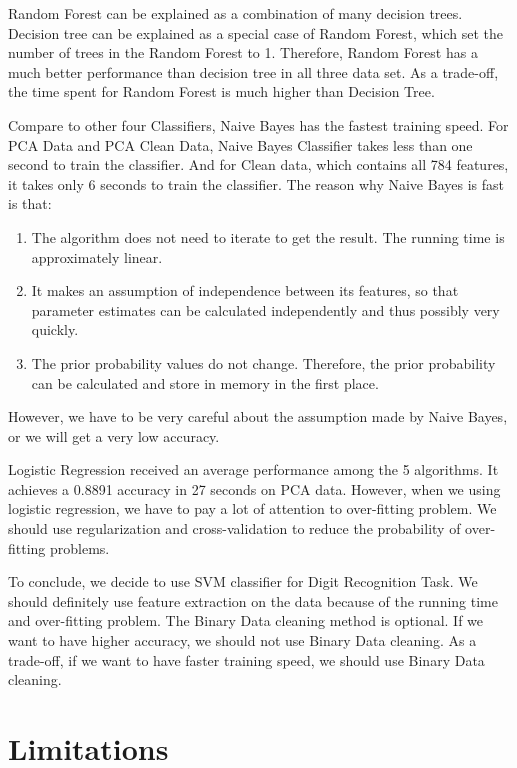\documentclass[sigconf]{acmart}
\begin{document}
Random Forest can be explained as a combination of many decision trees. Decision tree can be explained as a special case of Random Forest, which set the number of trees in the Random Forest to 1. Therefore, Random Forest has a much better performance than decision tree in all three data set. As a trade-off, the time spent for Random Forest is much higher than Decision Tree.

Compare to other four Classifiers, Naive Bayes has the fastest training speed. For PCA Data and PCA Clean Data, Naive Bayes Classifier takes less than one second to train the classifier. And for Clean data, which contains all 784 features, it takes only 6 seconds to train the classifier. The reason why Naive Bayes is fast is that:

\begin{enumerate}
    \item The algorithm does not need to iterate to get the result. The running time is approximately linear.
    \item It makes an assumption of independence between its features, so that parameter estimates can be calculated independently and thus possibly very quickly.
    \item The prior probability values do not change. Therefore, the prior probability can be calculated and store in memory in the first place. 
\end{enumerate}

However, we have to be very careful about the assumption made by Naive Bayes, or we will get a very low accuracy.

Logistic Regression received an average performance among the 5 algorithms. It achieves a 0.8891 accuracy in 27 seconds on PCA data. However, when we using logistic regression, we have to pay a lot of attention to over-fitting problem. We should use regularization and cross-validation to reduce the probability of over-fitting problems.

To conclude, we decide to use SVM classifier for Digit Recognition Task. We should definitely use feature extraction on the data because of the running time and over-fitting problem. The Binary Data cleaning method is optional. If we want to have higher accuracy, we should not use Binary Data cleaning. As a trade-off, if we want to have faster training speed, we should use Binary Data cleaning.

\section{Limitations}
\end{document}
